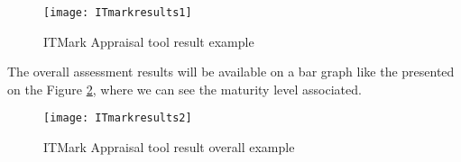 \begin{figure}[h]
	\begin{center}
		\leavevmode
		\texttt{[image: ITmarkresults1]}
		\caption{ITMark Appraisal tool result example}
		\label{fig:itmark_result1}
	\end{center}
\end{figure}

The overall assessment results will be available on a bar graph like the presented on the Figure \ref{fig:itmark_result2}, where we can see the maturity level associated.

\begin{figure}[h]
	\begin{center}
		\leavevmode
		\texttt{[image: ITmarkresults2]}
		\caption{ITMark Appraisal tool result overall example}
		\label{fig:itmark_result2}
	\end{center}
\end{figure}